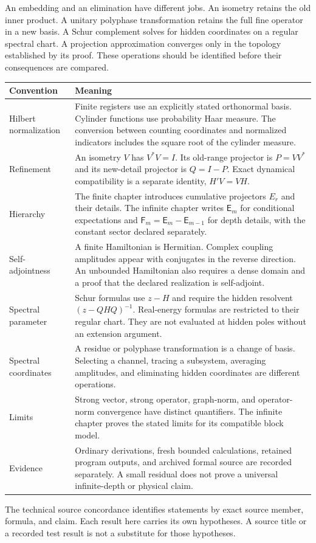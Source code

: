 An embedding and an elimination have different jobs. An isometry retains the old inner product. A unitary polyphase transformation retains the full fine operator in a new basis. A Schur complement solves for hidden coordinates on a regular spectral chart. A projection approximation converges only in the topology established by its proof. These operations should be identified before their consequences are compared.

\begingroup\small\renewcommand{\arraystretch}{1.1}
\begin{longtable}{@{}L{.24\linewidth}L{.67\linewidth}@{}}
\toprule
Convention & Meaning\\\midrule\endhead
Hilbert normalization & Finite registers use an explicitly stated orthonormal basis. Cylinder functions use probability Haar measure. The conversion between counting coordinates and normalized indicators includes the square root of the cylinder measure.\\
Refinement & An isometry $V$ has $V^*V=I$. Its old-range projector is $P=VV^*$ and its new-detail projector is $Q=I-P$. Exact dynamical compatibility is a separate identity, $H'V=VH$.\\
Hierarchy & The finite chapter introduces cumulative projectors $E_r$ and their details. The infinite chapter writes $\mathsf E_m$ for conditional expectations and $\mathsf F_m=\mathsf E_m-\mathsf E_{m-1}$ for depth details, with the constant sector declared separately.\\
Self-adjointness & A finite Hamiltonian is Hermitian. Complex coupling amplitudes appear with conjugates in the reverse direction. An unbounded Hamiltonian also requires a dense domain and a proof that the declared realization is self-adjoint.\\
Spectral parameter & Schur formulas use $z-H$ and require the hidden resolvent $(z-QHQ)^{-1}$. Real-energy formulas are restricted to their regular chart. They are not evaluated at hidden poles without an extension argument.\\
Spectral coordinates & A residue or polyphase transformation is a change of basis. Selecting a channel, tracing a subsystem, averaging amplitudes, and eliminating hidden coordinates are different operations.\\
Limits & Strong vector, strong operator, graph-norm, and operator-norm convergence have distinct quantifiers. The infinite chapter proves the stated limits for its compatible block model.\\
Evidence & Ordinary derivations, fresh bounded calculations, retained program outputs, and archived formal source are recorded separately. A small residual does not prove a universal infinite-depth or physical claim.\\
\bottomrule
\end{longtable}
\endgroup

The technical source concordance identifies statements by exact source member, formula, and claim. Each result here carries its own hypotheses. A source title or a recorded test result is not a substitute for those hypotheses.

\clearpage

